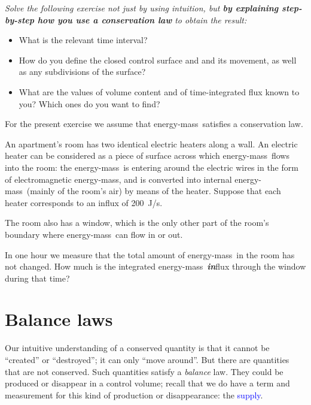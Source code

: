 \documentclass[a4paper,12pt,%
onecolumn,oneside,%
british%
]{memoir}
\renewcommand*{\|}[1][]{\nonscript\:#1\vert\nonscript\:\mathopen{}}
\newcommand*{\sect}{\S}%
\renewcommand*{\autoref}[2]{\sidepar{\vspace{-1ex}\footnotesize{\color{blue}\faIcon{%
angle-right%
}\enskip\sect~\ref{#1} page~\pageref{#1}}}\textcolor{blue}{#2}}
\newcommand*{\energym}{energy-mass}
\begin{document}
\begin{exercise}
{\itshape Solve the following exercise not just by using intuition, but \textbf{by explaining step-by-step how you use a conservation law} to obtain the result:
\begin{itemize}[nosep]
\item What is the relevant time interval?
\item How do you define the closed control surface and and its movement, as well as any subdivisions of the surface?
\item What are the values of volume content and of time-integrated flux  known to you? Which ones do you want to find?
\end{itemize}}

\medskip

For the present exercise we assume that \energym\ satisfies a conservation law.

    \smallskip

An apartment's room has two identical electric heaters along a wall. An electric heater can be considered as a piece of surface across which \energym\ flows into the room: the \energym\ is entering around the electric wires in the form of electromagnetic \energym, and is converted into internal \energym\ (mainly of the room's air) by means of the heater. Suppose that each heater corresponds to an influx of \qty{200}{J/s}.

\smallskip

    The room also has a window, which is the only other part of the room's boundary where \energym\ can flow in or out.

    \smallskip

    In one hour we measure that the total amount of \energym\ in the room has not changed. How much is the integrated \energym\ \emph{\textbf{in}}flux through the window during that time?
\end{exercise}




\section{Balance laws}
\label{sec:balance_laws}

Our intuitive understanding of a conserved quantity is that it cannot be \enquote{created} or \enquote{destroyed}; it can only \enquote{move around}. But there are quantities that are not conserved. Such quantities satisfy a \emph{balance} law. They could be produced or disappear in a control volume; recall that we do have a term and measurement for this kind of production or disappearance: the \autoref{def:fluxsupply}{supply}.
\end{document}
